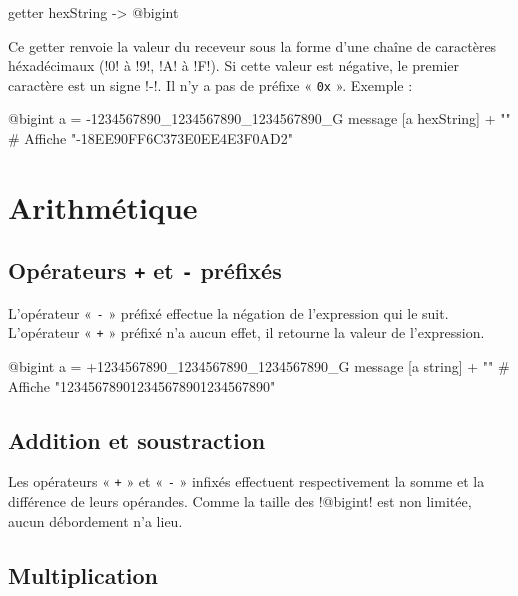 \begin{galgas}
getter hexString -> @bigint
\end{galgas}

Ce getter renvoie la valeur du receveur sous la forme d'une chaîne de caractères héxadécimaux (\ggs!0! à \ggs!9!, \ggs!A! à \ggs!F!). Si cette valeur est négative, le premier caractère est un signe \ggs!-!. Il n'y a pas de préfixe « \texttt{0x} ». Exemple :

\begin{galgas}
@bigint a = -1234567890_1234567890_1234567890_G
message [a hexString] + "\n" # Affiche "-18EE90FF6C373E0EE4E3F0AD2"
\end{galgas}









\section{Arithmétique}

\subsection{Opérateurs \texttt{+} et \texttt{-} préfixés}

L'opérateur « \texttt{-} » préfixé effectue la négation de l'expression qui le suit. L'opérateur « \texttt{+} » préfixé n'a aucun effet, il retourne la valeur de l'expression.

\begin{galgas}
@bigint a = +1234567890_1234567890_1234567890_G
message [a string] + "\n" # Affiche "123456789012345678901234567890"
\end{galgas}


\subsection{Addition et soustraction}

Les opérateurs « \texttt{+} » et « \texttt{-} » infixés effectuent respectivement la somme et la différence de leurs opérandes. Comme la taille des \ggs!@bigint! est non limitée, aucun débordement n'a lieu.



\subsection{Multiplication}

